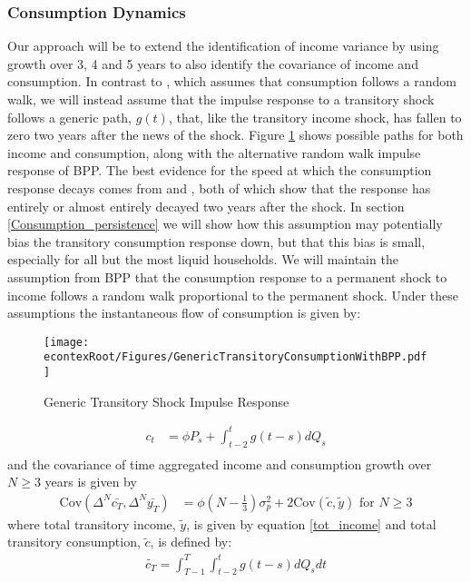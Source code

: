 \documentclass[titlepage]{\econtex}\newcommand{\texname}{ConsumptionHeterogeneity}
\begin{document}
\subsubsection{Consumption Dynamics} \label{cons_dynamics}
Our approach will be to extend the identification of income variance by using growth over 3, 4 and 5 years to also identify the covariance of income and consumption. In contrast to \cite{blundell_consumption_2008}, which assumes that consumption follows a random walk, we will instead assume that the impulse response to a transitory shock follows a generic path, $g(t)$, that, like the transitory income shock, has fallen to zero two years after the news of the shock. Figure \ref{fig:GenericTransitoryBPP} shows possible paths for both income and consumption, along with the alternative random walk impulse response of BPP. The best evidence for the speed at which the consumption response decays comes from \cite{gelman_what_2016} and \cite{fagereng_mpc_2016}, both of which show that the response has entirely or almost entirely decayed two years after the shock. In section \ref{Consumption_persistence} we will show how this assumption may potentially bias the transitory consumption response down, but that this bias is small, especially for all but the most liquid households. We will maintain the assumption from BPP that the consumption response to a permanent shock to income follows a random walk proportional to the permanent shock. Under these assumptions the instantaneous flow of consumption is given by:	\begin{figure} 
	\begin{centering}
		\texttt{[image: \\econtexRoot/Figures/GenericTransitoryConsumptionWithBPP.pdf]} 
		\caption{Generic Transitory Shock Impulse Response}
		\label{fig:GenericTransitoryBPP}
	\end{centering}
\end{figure}
\begin{align*}
c_t  &= \phi P_s  + \int_{t-2}^{t} g(t-s)dQ_s  \\
\end{align*}
and the covariance of time aggregated income and consumption growth over $N \geq 3$ years is given by
\begin{align}
\mathrm{Cov}(\Delta^N \bar{c_T},\Delta^N \bar{y_T} ) &= \phi (N-\frac{1}{3}) \sigma^2_p + 2 \mathrm{Cov}(\tilde{c},\tilde{y}) \text{  for  } N\geq 3 \label{covariance}
\end{align}
where total transitory income, $\tilde{y}$, is given by equation \ref{tot_income} and total transitory consumption, $\tilde{c}$, is defined by:
\begin{align}
\tilde{c_T} = \int_{T-1}^{T}\int_{t-2}^{t} g(t-s)dQ_s dt \label{tot_cons}
\end{align}
\end{document}
